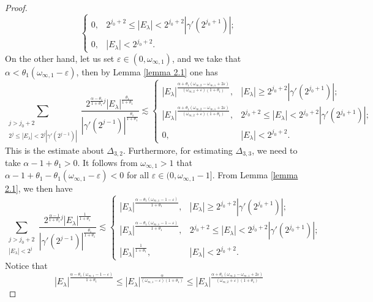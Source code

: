 \documentclass[11pt, twoside, leqno]{article}
\theoremstyle{definition}
\numberwithin{equation}{section}
\begin{document}
\begin{proof}
$$\begin{cases}
  0, & 2^{j_0+2}\leq|E_{\lambda}|<2^{j_0+2}|\gamma'(2^{j_{0}+1})|;\\
  0, &|E_{\lambda}|<2^{j_0+2}.
\end{cases}$$
On the other hand, let us set $\varepsilon\in(0,\omega_{\infty,1})$, and we take that $\alpha<\theta_{1}(\omega_{\infty,1}-\varepsilon)$, then by Lemma \ref{lemma 2.1} one has
$$\sum\limits_{  \substack{j>j_{0}+2   \\2^j\leq|E_\lambda|<2^j|\gamma'(2^{j-1})|  }}   {\frac{2^{{\frac{\alpha-\theta_{1}}{1+\theta_{1}}}j}|E_\lambda|^{\frac{\theta_{1}}{1+\theta_{1}}}}{|\gamma'(2^{j-1})|^{\frac{\theta_{1}}{1+\theta_{1}}}}} \lesssim
\begin{cases}
  |E_\lambda|^{{\frac{\alpha+\theta_1(\omega_{\infty,2}-\omega_{\infty,1}+2\varepsilon)}{(\omega_{\infty,2}+\varepsilon)(1+\theta_{1})}}}, & |E_\lambda|\geq2^{j_0+2}|\gamma'(2^{j_{0}+1})|;\\
  |E_\lambda|^{{\frac{\alpha+\theta_1(\omega_{\infty,2}-\omega_{\infty,1}+2\varepsilon)}{(\omega_{\infty,2}+\varepsilon)(1+\theta_{1})}}}, & 2^{j_0+2}\leq|E_{\lambda}|<2^{j_0+2}|\gamma'(2^{j_{0}+1})|;\\
 0, &|E_{\lambda}|<2^{j_0+2}.
\end{cases}$$
This is the estimate about $\Delta_{3,2}$. Furthermore, for estimating $\Delta_{3,3}$, we need to take $\alpha-1+\theta_{1}>0$. It follows from $\omega_{\infty,1}>1$ that $\alpha-1+\theta_{1}-\theta_{1}(\omega_{\infty,1}-\varepsilon)<0$ for all $\varepsilon\in(0,\omega_{\infty,1}-1]$. From Lemma \ref{lemma 2.1}, we then have
$$\sum\limits_{  \substack{j>j_{0}+2   \\|E_\lambda|<2^j}}  {\frac{2^{{\frac{\alpha-1}{1+\theta_{1}}}j}|E_\lambda|^{\frac{1}{1+\theta_{1}}}}{|\gamma'(2^{j-1})|^{\frac{\theta_{1}}{1+\theta_{1}}}}}\lesssim
\begin{cases}
  |E_\lambda|^{{\frac{\alpha-\theta_1(\omega_{\infty,1}-1-\varepsilon)}{1+\theta_{1}}}},
  & |E_\lambda|\geq2^{j_0+2}|\gamma'(2^{j_{0}+1})|; \\
  |E_\lambda|^{{\frac{\alpha-\theta_1(\omega_{\infty,1}-1-\varepsilon)}{1+\theta_{1}}}},  & 2^{j_0+2}\leq|E_{\lambda}|<2^{j_0+2}|\gamma'(2^{j_{0}+1})|;\\
  |E_\lambda|^{{\frac{1}{1+\theta_1}}}, &|E_{\lambda}|<2^{j_0+2}.
\end{cases}$$
Notice that  $$ |E_\lambda|^{{\frac{\alpha-\theta_1(\omega_{\infty,1}-1-\varepsilon)}{1+\theta_{1}}}}\leq|E_\lambda|^{\frac{\alpha}{(\omega_{\infty,1}-\varepsilon)(1+\theta_{1})}} \leq  |E_\lambda|^{{\frac{\alpha+\theta_1(\omega_{\infty,2}-\omega_{\infty,1}+2\varepsilon)}{(\omega_{\infty,2}+\varepsilon)(1+\theta_{1})}}}$$

\end{proof}
\end{document}
